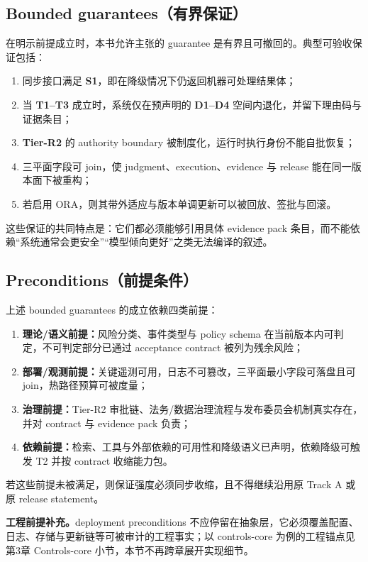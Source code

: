 \documentclass[11pt,a4paper]{report}
\begin{document}
\subsection{Bounded guarantees（有界保证）}
在明示前提成立时，本书允许主张的 guarantee 是有界且可撤回的。典型可验收保证包括：
\begin{enumerate}
  \item 同步接口满足 \textbf{S1}，即在降级情况下仍返回机器可处理结果体；
  \item 当 \textbf{T1--T3} 成立时，系统仅在预声明的 \textbf{D1--D4} 空间内退化，并留下理由码与证据条目；
  \item \textbf{Tier-R2} 的 authority boundary 被制度化，运行时执行身份不能自批恢复；
  \item 三平面字段可 join，使 judgment、execution、evidence 与 release 能在同一版本面下被重构；
  \item 若启用 ORA，则其带外适应与版本单调更新可以被回放、签批与回滚。
\end{enumerate}
\noindent 这些保证的共同特点是：它们都必须能够引用具体 evidence pack 条目，而不能依赖“系统通常会更安全”“模型倾向更好”之类无法编译的叙述。

\subsection{Preconditions（前提条件）}
上述 bounded guarantees 的成立依赖四类前提：
\begin{enumerate}
  \item \textbf{理论/语义前提：}风险分类、事件类型与 policy schema 在当前版本内可判定，不可判定部分已通过 acceptance contract 被列为残余风险；
  \item \textbf{部署/观测前提：}关键遥测可用，日志不可篡改，三平面最小字段可落盘且可 join，热路径预算可被度量；
  \item \textbf{治理前提：}Tier-R2 审批链、法务/数据治理流程与发布委员会机制真实存在，并对 contract 与 evidence pack 负责；
  \item \textbf{依赖前提：}检索、工具与外部依赖的可用性和降级语义已声明，依赖降级可触发 T2 并按 contract 收缩能力包。
\end{enumerate}
\noindent 若这些前提未被满足，则保证强度必须同步收缩，且不得继续沿用原 Track A 或原 release statement。

\noindent\textbf{工程前提补充。}deployment preconditions 不应停留在抽象层，它必须覆盖配置、日志、存储与更新链等可被审计的工程事实；以 controls-core 为例的工程锚点见第3章 Controls-core 小节，本节不再跨章展开实现细节。
\end{document}
